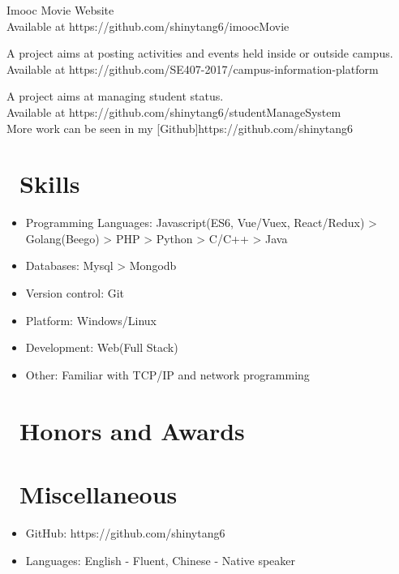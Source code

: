 \documentclass{resume}
\begin{document}
Imooc Movie Website\\
Available at https://github.com/shinytang6/imoocMovie

A project aims at posting activities and events held inside or outside campus.\\
Available at https://github.com/SE407-2017/campus-information-platform

A project aims at managing student status.\\
Available at https://github.com/shinytang6/studentManageSystem
\\
More work can be seen in my [Github]{https://github.com/shinytang6}

\section{\faCogs\ Skills}
\begin{itemize}[parsep=0.5ex]
  \item Programming Languages: Javascript(ES6, Vue/Vuex, React/Redux) > Golang(Beego) > PHP > Python > C/C++ > Java
  \item Databases: Mysql > Mongodb
  \item Version control: Git
  \item Platform: Windows/Linux
  \item Development: Web(Full Stack)
  \item Other: Familiar with TCP/IP and network programming
\end{itemize}

\section{\faHeartO\ Honors and Awards}

\section{\faInfo\ Miscellaneous}
\begin{itemize}[parsep=0.5ex]
  \item GitHub: https://github.com/shinytang6
  \item Languages: English - Fluent, Chinese - Native speaker
\end{itemize}

%
%
\end{document}
